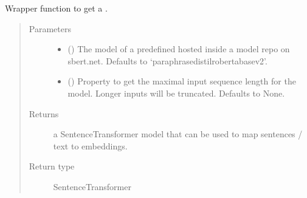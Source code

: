 \documentclass[letterpaper,10pt,english]{sphinxmanual}
\begin{document}
\begin{fulllineitems}
\label{\detokenize{code:code_utils.utils.get_sentence_transformer}}
Wrapper function to get a .
\begin{quote}\begin{description}
\item[{Parameters}] \leavevmode\begin{itemize}
\item {} 
 (\sphinxstyleliteralemphasis{\sphinxupquote{, }}) \textendash{} The model  of a predefined  hosted
inside a model repo on sbert.net. Defaults to ‘paraphrase\sphinxhyphen{}distilroberta\sphinxhyphen{}base\sphinxhyphen{}v2’.

\item {} 
 () \textendash{} Property to get the maximal input sequence length
for the model. Longer inputs will be truncated. Defaults to None.

\end{itemize}

\item[{Returns}] \leavevmode
a SentenceTransformer model that can be used to map sentences / text
to embeddings.

\item[{Return type}] \leavevmode
SentenceTransformer

\end{description}\end{quote}

\end{fulllineitems}

\end{document}
